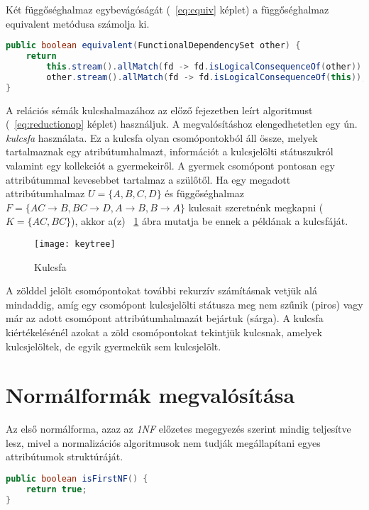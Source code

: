 Két függőséghalmaz egybevágóságát (~\ref{eq:equiv} képlet) a függőséghalmaz equivalent metódusa számolja ki.

\linespread{1}
\begin{lstlisting}[float,floatplacement=H,language=Java]
public boolean equivalent(FunctionalDependencySet other) {
	return 
		this.stream().allMatch(fd -> fd.isLogicalConsequenceOf(other)) &&
		other.stream().allMatch(fd -> fd.isLogicalConsequenceOf(this));
}
\end{lstlisting}

A relációs sémák kulcshalmazához az előző fejezetben leírt algoritmust (~\ref{eq:reductionop} képlet) használjuk. A megvalósításhoz elengedhetetlen egy ún. \textit{kulcsfa}  használata. Ez a kulcsfa olyan csomópontokból áll össze, melyek tartalmaznak egy atribútumhalmazt, információt a kulcsjelölti státuszukról valamint egy kollekciót a gyermekeiről. A gyermek csomópont pontosan egy attribútummal kevesebbet tartalmaz a szülőtől. Ha egy megadott attribútumhalmaz $U=\{A,B,C,D\}$ és függőséghalmaz $F=\{AC \to B,BC \to D,A \to B,B \to A\}$ kulcsait szeretnénk megkapni ($K=\{AC,BC\}$), akkor a(z) ~\ref{fig:keytree} ábra mutatja be ennek a példának a kulcsfáját.

\begin{figure}
    \centering
    \texttt{[image: keytree]}
    \caption{Kulcsfa}
    \label{fig:keytree}
\end{figure}

A zölddel jelölt csomópontokat további rekurzív számításnak vetjük alá mindaddig, amíg egy csomópont kulcsjelölti státusza meg nem szűnik (piros) vagy már az adott csomópont attribútumhalmazát bejártuk (sárga). A kulcsfa kiértékelésénél azokat a zöld csomópontokat tekintjük kulcsnak, amelyek kulcsjelöltek, de egyik gyermekük sem kulcsjelölt.

\section{Normálformák megvalósítása}

Az első normálforma, azaz az \textit{1NF} előzetes megegyezés szerint mindig teljesítve lesz, mivel a normalizációs algoritmusok nem tudják megállapítani egyes attribútumok struktúráját.

\linespread{1}
\begin{lstlisting}[language=Java]
public boolean isFirstNF() {
	return true;
}
\end{lstlisting}

